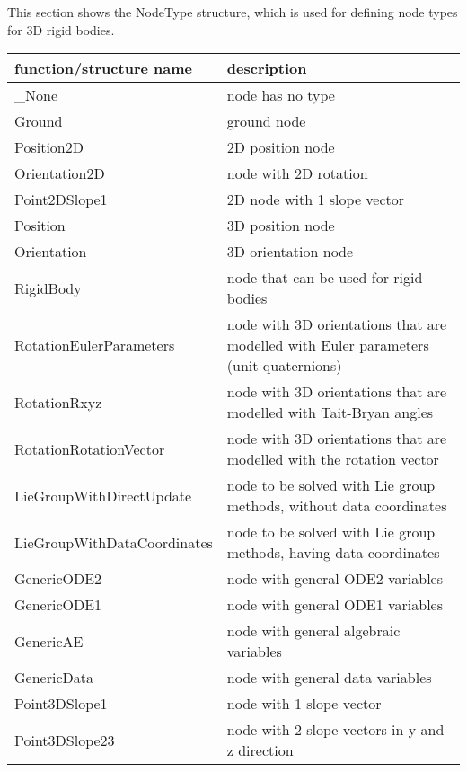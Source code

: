 \label{sec:NodeType}
This section shows the NodeType structure, which is used for defining node types for 3D rigid bodies.



\begin{center}
\footnotesize
\begin{longtable}{| p{8cm} | p{8cm} |} 
\hline
{\bf function/structure name} & {\bf description}\\ \hline
  \_None & node has no type\\ \hline 
  Ground & ground node\\ \hline 
  Position2D & 2D position node \\ \hline 
  Orientation2D & node with 2D rotation\\ \hline 
  Point2DSlope1 & 2D node with 1 slope vector\\ \hline 
  Position & 3D position node\\ \hline 
  Orientation & 3D orientation node\\ \hline 
  RigidBody & node that can be used for rigid bodies\\ \hline 
  RotationEulerParameters & node with 3D orientations that are modelled with Euler parameters (unit quaternions)\\ \hline 
  RotationRxyz & node with 3D orientations that are modelled with Tait-Bryan angles\\ \hline 
  RotationRotationVector & node with 3D orientations that are modelled with the rotation vector\\ \hline 
  LieGroupWithDirectUpdate & node to be solved with Lie group methods, without data coordinates\\ \hline 
  LieGroupWithDataCoordinates & node to be solved with Lie group methods, having data coordinates\\ \hline 
  GenericODE2 & node with general ODE2 variables\\ \hline 
  GenericODE1 & node with general ODE1 variables\\ \hline 
  GenericAE & node with general algebraic variables\\ \hline 
  GenericData & node with general data variables\\ \hline 
  Point3DSlope1 & node with 1 slope vector\\ \hline 
  Point3DSlope23 & node with 2 slope vectors in y and z direction\\ \hline 
\end{longtable}
\end{center}

